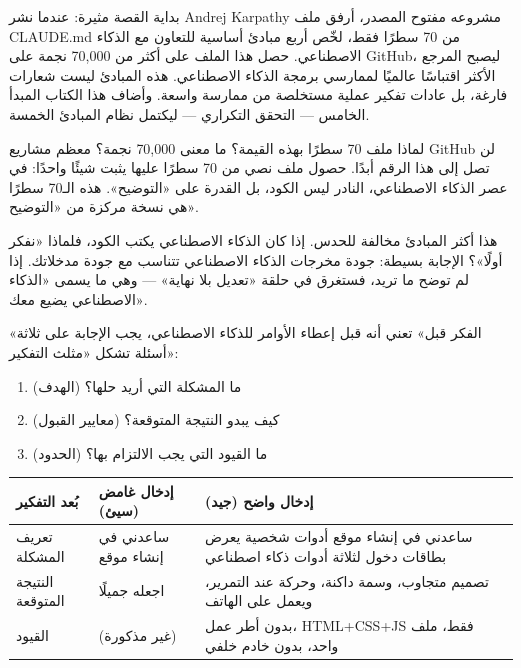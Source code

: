 

بداية القصة مثيرة: عندما نشر Andrej Karpathy مشروعه مفتوح المصدر، أرفق ملف CLAUDE.md من 70 سطرًا فقط، لخّص أربع مبادئ أساسية للتعاون مع الذكاء الاصطناعي. حصل هذا الملف على أكثر من 70,000 نجمة على GitHub، ليصبح المرجع الأكثر اقتباسًا عالميًا لممارسي برمجة الذكاء الاصطناعي. هذه المبادئ ليست شعارات فارغة، بل عادات تفكير عملية مستخلصة من ممارسة واسعة. وأضاف هذا الكتاب المبدأ الخامس — التحقق التكراري — ليكتمل نظام المبادئ الخمسة.

\begin{tcbinfo}{لماذا ملف 70 سطرًا بهذه القيمة؟}
ما معنى 70,000 نجمة؟ معظم مشاريع GitHub لن تصل إلى هذا الرقم أبدًا. حصول ملف نصي من 70 سطرًا عليها يثبت شيئًا واحدًا: في عصر الذكاء الاصطناعي، النادر ليس الكود، بل القدرة على «التوضيح». هذه الـ70 سطرًا هي نسخة مركزة من «التوضيح».

\end{tcbinfo}


هذا أكثر المبادئ مخالفة للحدس. إذا كان الذكاء الاصطناعي يكتب الكود، فلماذا «نفكر أولًا»؟ الإجابة بسيطة: جودة مخرجات الذكاء الاصطناعي تتناسب مع جودة مدخلاتك. إذا لم توضح ما تريد، فستغرق في حلقة «تعديل بلا نهاية» — وهي ما يسمى «الذكاء الاصطناعي يضيع معك».

«الفكر قبل» تعني أنه قبل إعطاء الأوامر للذكاء الاصطناعي، يجب الإجابة على ثلاثة أسئلة تشكل «مثلث التفكير»:

\begin{enumerate}
  \item ما المشكلة التي أريد حلها؟ (الهدف)
  \item كيف يبدو النتيجة المتوقعة؟ (معايير القبول)
  \item ما القيود التي يجب الالتزام بها؟ (الحدود)
\end{enumerate}

\begin{center}
\begin{tabularx}{\linewidth}{|X|X|X|}
\hline
\textbf{بُعد التفكير} & \textbf{إدخال غامض (سيئ)} & \textbf{إدخال واضح (جيد)} \tabularnewline
\hline
تعريف المشكلة & ساعدني في إنشاء موقع & ساعدني في إنشاء موقع أدوات شخصية يعرض بطاقات دخول لثلاثة أدوات ذكاء اصطناعي \tabularnewline
النتيجة المتوقعة & اجعله جميلًا & تصميم متجاوب، وسمة داكنة، وحركة عند التمرير، ويعمل على الهاتف \tabularnewline
القيود & (غير مذكورة) & بدون أطر عمل، HTML+CSS+JS فقط، ملف واحد، بدون خادم خلفي \tabularnewline
\hline
\end{tabularx}
\end{center}

